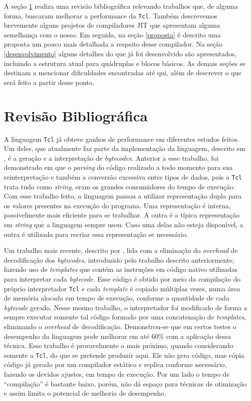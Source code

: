 A seção \ref{rev_biblio} realiza uma revisão bibliográfica relevando
trabalhos que, de alguma forma, buscaram melhorar a performance da
\texttt{Tcl}. Também descrevemos brevemente alguns projetos de
compiladores JIT que apresentam alguma semelhança com o nosso. Em
seguida, na seção \ref{proposta} é descrito uma proposta um pouco mais
detalhada a respeito desse compilador. Na seção \ref{desenvolvimento}
alguns detalhes do que já foi desenvolvido são apresentados, incluindo a
estrutura atual para quádruplas e blocos básicos. As demais seções
se destinam a mencionar dificuldades encontradas até qui, além de
descrever o que será feito a partir desse ponto.


\section{Revisão Bibliográfica}
\label{rev_biblio}

A linguagem \texttt{Tcl} já obteve ganhos de performance em diferentes
estudos feitos. Um deles, que atualmente faz parte da implementação da
linguagem, descrito em , é a geração e a
interpretação de \textit{bytecodes}. Anterior a esse trabalho, foi
demonstrado em  que o \textit{parsing} do código
realizado a todo momento para sua reinterpretação e também a conversão
excessiva entre tipos de dados, pois a \texttt{Tcl} trata tudo como
\textit{string},
eram os grandes consumidores do tempo de execução. Com esse trabalho
feito, a linguagem passou a utilizar representação dupla para os
valores presentes na execução do programa. Uma representação é
interna, possivelmente mais eficiente para se trabalhar. A outra é a
típica representação em \textit{string} que a linguagem sempre usou. Caso uma
delas não esteja disponível, a outra é utilizada para recriar essa
representação se necessário.

Um trabalho mais recente, descrito por , lida
com a eliminação do \textit{overhead} de decodificação dos
\textit{bytecodes}, introduzido pelo trabalho descrito anteriormente,
fazendo uso de \textit{templates} que contém as instruções em
código nativo utilizadas para interpretar cada \textit{bytecode}.
Esse código é obtido por meio da compilação do próprio interpretador
\texttt{Tcl} e cada \textit{template} é copiado múltiplas vezes,
numa área de memória alocada em tempo de execução, conforme a quantidade de
cada \textit{bytecode} gerado. Nesse mesmo trabalho, o interpretador foi
modificado de forma a sempre executar somente tal código formado por
uma concatenação de \textit{templates}, eliminando o \textit{overhead} de
decodificação. Demonstrou-se que em certos testes o desempenho da
linguagem pode melhorar em até 60\% com a aplicação dessa técnica.
Esse trabalho é provavelmente o mais próximo, quando considerando
somente a \texttt{Tcl}, do que se pretende produzir aqui.
Ele não gera código, mas cópia código já gerado por um compilador
estático e replica conforme necessário, fazendo os devidos
ajustes, em tempo de execução. Por um lado o tempo de ``compilação'' é
bastante baixo, porém, não dá espaço para técnicas de otimização e assim
limita o potencial de melhoria de desempenho.

